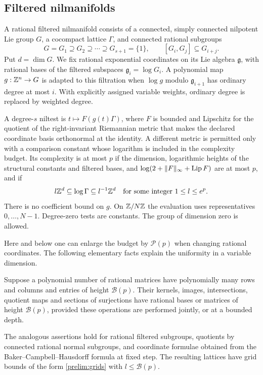 \subsection{Filtered nilmanifolds}

\begin{definition}[Niltests]\label{prelim:niltest}
A rational filtered nilmanifold consists of a connected, simply
connected nilpotent Lie group $G$, a cocompact lattice $\Gamma$, and
connected rational subgroups
\[
 G=G_1\supseteq G_2\supseteq\cdots\supseteq G_{s+1}=\{1\},
 \qquad [G_i,G_j]\subseteq G_{i+j}.
\]
Put $d=\dim G$.  We fix rational exponential coordinates on its Lie algebra
$\mathfrak g$, with rational bases of the filtered subspaces
$\mathfrak g_i=\log G_i$.  A polynomial map $g:\mathbb Z^n\to G$ is adapted
to this filtration when $\log g$ modulo $\mathfrak g_{i+1}$ has ordinary
degree at most $i$.  With explicitly assigned variable weights, ordinary
degree is replaced by weighted degree.

A degree-$s$ niltest is $t\mapsto F(g(t)\Gamma)$, where $F$ is bounded
and Lipschitz for the quotient of the right-invariant Riemannian
metric that makes the declared coordinate basis orthonormal at the
identity.  A different metric is permitted only with a comparison
constant whose logarithm is included in the complexity budget.
Its complexity is at most $p$ if the dimension, logarithmic heights of
the structural constants and filtered bases, and
$\log(2+\|F\|_\infty+\operatorname{Lip} F)$ are at most $p$, and if
\begin{equation}\label{prelim:grids}
 l\mathbb Z^d\subseteq\log\Gamma\subseteq l^{-1}\mathbb Z^d
 \quad\text{for some integer }1\leq l\leq e^p.
\end{equation}
There is no coefficient bound on $g$.  On $\mathbb Z/N\mathbb Z$ the evaluation
uses representatives $0,\ldots,N-1$.  Degree-zero tests are constants.
The group of dimension zero is allowed.
\end{definition}

Here and below one can enlarge the budget by $\mathcal P(p)$ when
changing rational coordinates.  The following elementary facts explain
the uniformity in a variable dimension.

\begin{lemma}\label{prelim:rational-operations}
Suppose a polynomial number of rational matrices have polynomially many
rows and columns and entries of height $\mathcal B(p)$.  Their kernels,
images, intersections, quotient maps and sections of surjections have
rational bases or matrices of height $\mathcal B(p)$, provided these
operations are performed jointly, or at a bounded depth.

The analogous assertions hold for rational filtered subgroups,
quotients by connected rational normal subgroups, and coordinate
formulae obtained from the Baker--Campbell--Hausdorff formula at fixed
step.  The resulting lattices have grid bounds of the form
\eqref{prelim:grids} with $l\leq\mathcal B(p)$.
\end{lemma}

